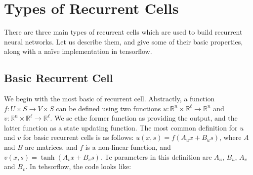 \documentclass[10pt]{amsart}
\newcommand{\R}{\mathbb{R}}
\theoremstyle{definition}
\begin{document}



\section{Types of Recurrent Cells}

There are three main types of recurrent cells which are used to build recurrent neural networks.  Let us describe them, and give some of their basic properties, along with a na\"ive implementation in tensorflow.

\subsection{Basic Recurrent Cell} We begin with the most basic of recurrent cell. Abstractly, a function $f:U\times S\to V\times S$ can be defined using two functions $u:\R^n\times \R^\ell\to \R^n$ and $v:\R^n\times\R^\ell \to \R^\ell$. We se ethe former function as providing the output, and the latter function as a state updating function.  The most common definition for $u$ and $v$ for basic recurrent cells is as follows: $u(x, s) = f(A_ux+B_us)$, where $A$ nad $B$ are matrices, and $f$ is a non-linear function, and $v(x, s) = \tanh(A_vx+B_vs)$. Te parameters in this definition are $A_u$, $B_u$, $A_v$ and $B_v$. In tehsorflow, the code looks like:
\end{document}
